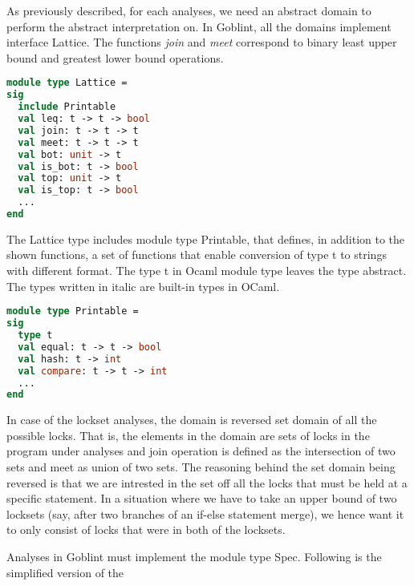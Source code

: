 \documentclass[..thesis.tex]{subfiles}
\begin{document}
As previously described, for each analyses, we need an abstract domain to perform the abstract interpretation on. In Goblint, all the domains implement interface Lattice. The functions \textit{join} and \textit{meet} correspond to binary least upper bound and greatest lower bound operations.  


\begin{lstlisting}[language=Caml,style=caml]
module type Lattice =
sig
  include Printable
  val leq: t -> t -> bool
  val join: t -> t -> t
  val meet: t -> t -> t
  val bot: unit -> t
  val is_bot: t -> bool
  val top: unit -> t
  val is_top: t -> bool
  ...
end
\end{lstlisting}

The Lattice type includes module type Printable, that defines, in addition to the shown functions, a set of functions that enable conversion of type t to strings with different format. The type t in Ocaml module type leaves the type abstract. The types written in italic are built-in types in OCaml. 


\begin{lstlisting}[language=Caml,style=caml]
module type Printable =
sig
  type t
  val equal: t -> t -> bool
  val hash: t -> int
  val compare: t -> t -> int
  ...
end
\end{lstlisting}

In case of the lockset analyses, the domain is reversed set domain of all the possible locks. That is, the elements in the domain are sets of locks in the program under analyses and join operation is defined as the intersection of two sets and meet as union of two sets. The reasoning behind the set domain being reversed is that we are intrested in the set off all the locks that must be held at a specific statement. In a situation where we have to take an upper bound of two locksets (say, after two branches of an if-else statement merge), we hence want it to only consist of locks that were in both of the locksets.

Analyses in Goblint must implement the module type Spec. Following is the simplified version of the

\end{document}

